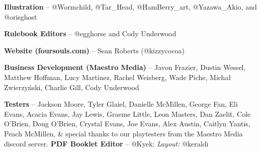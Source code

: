 \documentclass[
  fontsize=10pt,
  paper=a5,
  version=last,
  chapterprefix=true,
  bindingoffset=5mm,
  ]{scrbook}
\begin{document}
    \textbf{Illustration} – @Wormchild, @Tar\_Head, @HamBerry\_art, @Yazawa\_Akio, and @orisghost
    
    \textbf{Rulebook Editors} – @egghorse and Cody Underwood
    
    \textbf{Website (foursouls.com)} – Sean Roberts (@kizzycocoa)
    
    \textbf{Business Development (Maestro Media)} – Javon Frazier, Dustin Wessel, Matthew Hoffman, Lucy Martinez, Rachel Weisberg, Wade Piche, Michał Zwierzyński, Charlie Gill, Cody Underwood
    
    \textbf{Testers} – Jackson Moore, Tyler Glaiel, Danielle McMillen, George Fan, Eli Evans, Acacia Evans, Jay Lewis, Graeme Little, Leon Masters, Dan Zaelit, Cole O’Brien, Doug O’Brien, Crystal Evans, Joe Evans, Alex Austin, Caitlyn Yantis, Peach McMillen, \& special thanks to our playtesters from the Maestro Media discord server.
    \vfill
    \textbf{PDF Booklet Editor} – @Kyek; \textit{Layout:} @keraldi
\end{document}
